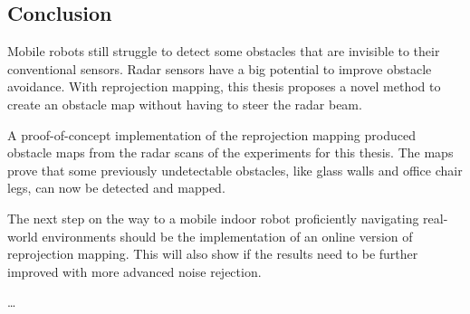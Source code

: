 \subsection{Conclusion}\label{conclusion-1}

Mobile robots still struggle to detect some obstacles that are invisible
to their conventional sensors. Radar sensors have a big potential to
improve obstacle avoidance. With reprojection mapping, this thesis
proposes a novel method to create an obstacle map without having to
steer the radar beam.

A proof-of-concept implementation of the reprojection mapping produced
obstacle maps from the radar scans of the experiments for this thesis.
The maps prove that some previously undetectable obstacles, like glass
walls and office chair legs, can now be detected and mapped.

The next step on the way to a mobile indoor robot proficiently
navigating real-world environments should be the implementation of an
online version of reprojection mapping. This will also show if the
results need to be further improved with more advanced noise rejection.

\ldots{}